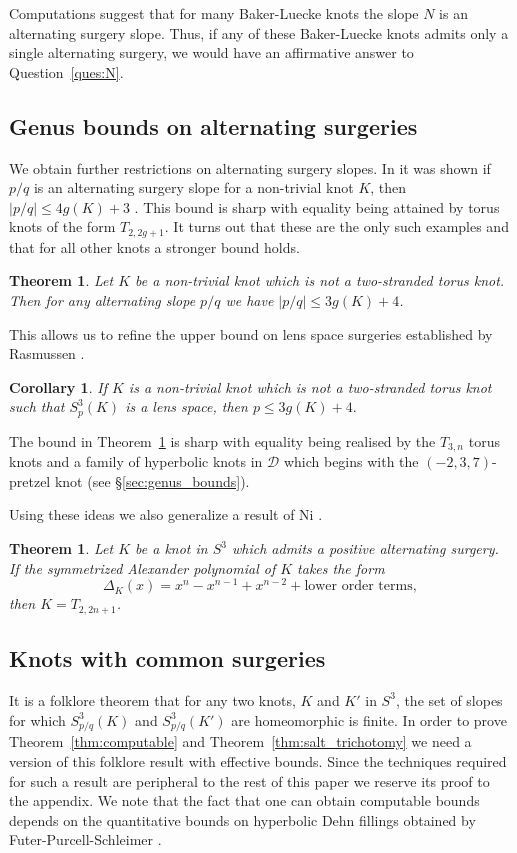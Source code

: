 \documentclass{amsart} %
\newcommand{\D}{\mathcal{D}}
\theoremstyle{thm}
\newtheorem{thm}[Theorem]{Theorem}
\newtheorem{cor}[Theorem]{Corollary}
\theoremstyle{definition}
\numberwithin{equation}{section}
\begin{document}
Computations suggest that for many Baker-Luecke knots the slope $N$ is an alternating surgery slope. Thus, if any of these Baker-Luecke knots admits only a single alternating surgery, we would have an affirmative answer to Question~\ref{ques:N}.

\subsection{Genus bounds on alternating surgeries}
We obtain further restrictions on alternating surgery slopes. In \cite{Mc17} it was shown if $p/q$ is an alternating surgery slope for a non-trivial knot $K$, then $|p/q|\leq 4g(K)+3$ \cite[Theorem~1.1]{Mc17}. This bound is sharp with equality being attained by torus knots of the form $T_{2,2g+1}$. It turns out that these are the only such examples and that for all other knots a stronger bound holds.
\newcommand{\genusbound}{Let $K$ be a non-trivial knot which is not a two-stranded torus knot. Then for any alternating slope $p/q$ we have $|p/q|\leq 3g(K)+4$.}
\begin{thm}\label{thm:genusbound}
\genusbound
\end{thm}
This allows us to refine the upper bound on lens space surgeries established by Rasmussen \cite{Rasmussen2004Goda}.
\begin{cor}
If $K$ is a non-trivial knot which is not a two-stranded torus knot such that $S_p^3(K)$ is a lens space, then $p\leq 3g(K)+4.$
\end{cor}
The bound in Theorem~\ref{thm:genusbound} is sharp with equality being realised by the $T_{3,n}$ torus knots and a family of hyperbolic knots in $\D$ which begins with the $(-2,3,7)$-pretzel knot (see \S\ref{sec:genus_bounds}).

Using these ideas we also generalize a result of Ni \cite[Corollary~1.7]{Ni2020Seifert}.
\newcommand{\thmpolyform}{Let $K$ be a knot in $S^3$ which admits a positive alternating surgery. If the symmetrized Alexander polynomial of $K$ takes the form
    \[
    \Delta_K(x)=x^n-x^{n-1}+x^{n-2} + \text{lower order terms},
    \]
    then $K=T_{2,2n+1}$.}
\begin{thm}\label{thm:Alexander_poly_form}
    \thmpolyform
\end{thm}

\subsection{Knots with common surgeries}
It is a folklore theorem that for any two knots, $K$ and $K'$ in $S^3$, the set of slopes for which $S_{p/q}^3(K)$ and $S_{p/q}^3(K')$ are homeomorphic is finite. In order to prove Theorem~\ref{thm:computable} and Theorem~\ref{thm:salt_trichotomy} we need a version of this folklore result with effective bounds. Since the techniques required for such a result are peripheral to the rest of this paper we reserve its proof to the appendix. We note that the fact that one can obtain computable bounds depends on the quantitative bounds on hyperbolic Dehn fillings obtained by Futer-Purcell-Schleimer \cite{FPS19}.
\end{document}
